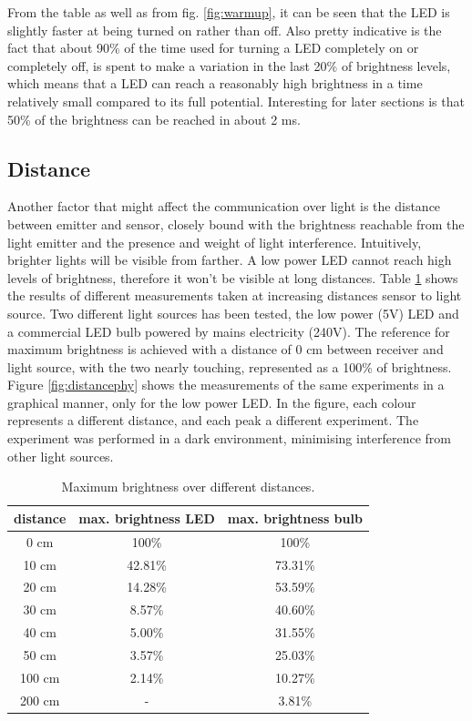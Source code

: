 From the table as well as from fig. \ref{fig:warmup}, it can be seen that the LED is slightly faster at being turned on rather than off.
Also pretty indicative is the fact that about 90\% of the time used for turning a LED completely on or completely off, is spent to make a variation in the last 20\% of brightness levels, which means that a LED can reach a reasonably high brightness in a time relatively small compared to its full potential.
Interesting for later sections is that 50\% of the brightness can be reached in about 2 ms.

\subsection{Distance}
\label{distancephy}
Another factor that might affect the communication over light is the distance between emitter and sensor, closely bound with the brightness reachable from the light emitter and the presence and weight of light interference.
Intuitively, brighter lights will be visible from farther.
A low power LED cannot reach high levels of brightness, therefore it won't be visible at long distances.
Table \ref{tab:distancesphy} shows the results of different measurements taken at increasing distances sensor to light source.
Two different light sources has been tested, the low power (5V) LED and a commercial LED bulb powered by mains electricity (240V).
The reference for maximum brightness is achieved with a distance of 0 cm between receiver and light source, with the two nearly touching, represented as a 100\% of brightness.
Figure \ref{fig:distancephy} shows the measurements of the same experiments in a graphical manner, only for the low power LED.
In the figure, each colour represents a different distance, and each peak a different experiment.
The experiment was performed in a dark environment, minimising interference from other light sources.

\begin{table}[hbt]
\centering
  \begin{tabular}{c | c || c}
    distance & max. brightness LED & max. brightness bulb \\
    \hline
    0 cm & 100\% & 100\% \\
    10 cm & 42.81\% & 73.31\%\\
    20 cm & 14.28\% & 53.59\%\\
    30 cm & 8.57\% & 40.60\%\\
    40 cm & 5.00\% &31.55\%\\
    50 cm & 3.57\% & 25.03\%\\
    100 cm & 2.14\% & 10.27\%\\
    200 cm & - & 3.81\% \\
  \end{tabular}
 \caption{Maximum brightness over different distances.}
  \label{tab:distancesphy}
\end{table}

